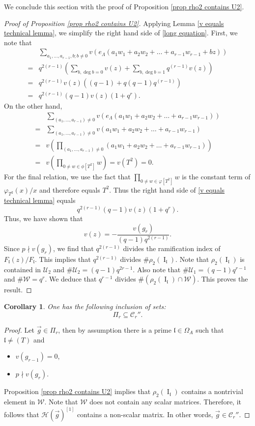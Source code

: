 \documentclass[11pt]{amsart}
\newtheorem{corollary}[theorem]{Corollary}
\newcommand{\fl}{\mathfrak{l}}
\newcommand{\cU}{\mathcal{U}}
\newcommand{\cH}{\mathcal{H}}
\newcommand{\cC}{\mathcal{C}}
\newcommand{\op}[1]{\operatorname{#1}}
\numberwithin{equation}{section}
\begin{document}
We conclude this section with the proof of Proposition \ref{prop rho2 contains U2}.

\begin{proof}[Proof of Proposition \ref{prop rho2 contains U2}]
    Applying Lemma \ref{v equals technical lemma}, we simplify the right hand side of \eqref{long equation}. First, we note that
    \[\begin{split}& \sum_{a_1, \dots, a_{r-1}, b; b\neq 0}v\left(e_\Lambda(a_1 w_1+a_2 w_2+\dots+a_{r-1} w_{r-1} +b z)\right) \\
=& q^{2(r-1)}  \left( \sum_{b, \op{deg} b=0} v(z)+\sum_{b, \op{deg} b=1} q^{(r-1)}v(z)\right) \\
=& q^{2(r-1)} v(z) \left( (q-1)+q(q-1)q^{(r-1)}\right) \\
=& q^{2(r-1)}(q-1)v(z)(1+q^{r}).\end{split}\]
On the other hand, 
  \[\begin{split}& \sum_{(a_1, \dots, a_{r-1})\neq 0}v\left(e_\Lambda(a_1 w_1+a_2 w_2+\dots+a_{r-1} w_{r-1})\right) \\
  =& \sum_{(a_1, \dots, a_{r-1})\neq 0}v(a_1 w_1+a_2 w_2+\dots+a_{r-1} w_{r-1}) \\
=& v\left(\prod_{(a_1, \dots, a_{r-1})\neq 0}(a_1 w_1+a_2 w_2+\dots+a_{r-1} w_{r-1})\right)\\
=& v\left(\prod_{0\neq w \in \phi[T^2]}w\right)=v(T^2)=0.\end{split}\]
For the final relation, we use the fact that $\prod_{0\neq w \in \varphi[T^2]}w$ is the constant term of $\varphi_{T^2}(x)/x$ and therefore equals $T^2$.
Thus the right hand side of \eqref{v equals technical lemma} equals \[q^{2(r-1)}(q-1)v(z)(1+q^{r}).\] Thus, we have shown that 
\[v(z)=-\frac{v(g_r)}{(q-1)q^{2(r-1)}}.\]
Since $p\nmid v(g_r)$, we find that $q^{2(r-1)}$ divides the ramification index of $F_{\fl}(z)/F_{\fl}$. This implies that $q^{2(r-1)}$ divides $\#\rho_2(\op{I}_{\fl})$. Note that $\rho_2(\op{I}_{\fl})$ is contained in $\cU_2$ and $\# \cU_2=(q-1) q^{2r-1}$. Also note that $\# \cU_1=(q-1) q^{r-1}$ and $\# \mathcal{W}=q^{r}$. We deduce that $q^{r-1}$ divides $\# \left(\rho_2(\op{I}_{\fl})\cap \mathcal{W}\right)$. This proves the result.
\end{proof}

\begin{corollary}\label{ Pi in cc}
    One has the following inclusion of sets:
    \[\Pi_r\subseteq \cC_r''.\]
\end{corollary}
\begin{proof}
    Let $\vec{g}\in \Pi_r$, then by assumption there is a prime $\fl\in \Omega_A$ such that $\fl\neq (T)$ and 
    \begin{itemize}
    \item $v(g_{r-1})=0$, 
    \item $p\nmid v(g_{r})$.
\end{itemize}
Proposition \ref{prop rho2 contains U2} implies that $\rho_2(\op{I}_{\fl})$ contains a nontrivial element in $\mathcal{W}$. Note that $\mathcal{W}$ does not contain any scalar matrices. Therefore, it follows that $\cH(\vec{g})^{[1]}$ contains a non-scalar matrix. In other words, $\vec{g}\in \cC_r''$.
\end{proof}
\end{document}
